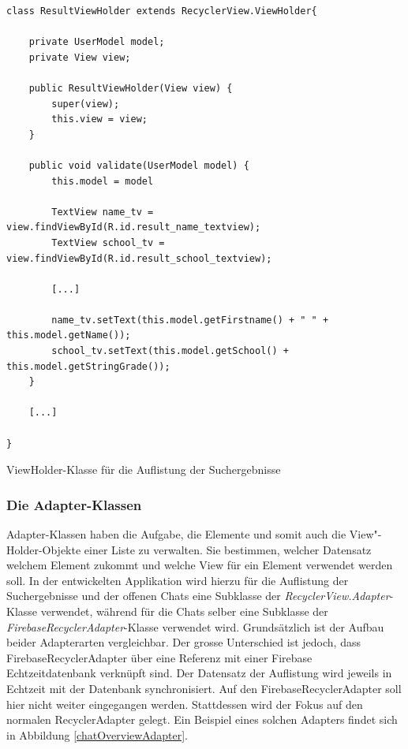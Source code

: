 \documentclass[../main.tex]{subfiles}
\begin{document}
\begin{code}
	\begin{center}
		\begin{verbatim}
class ResultViewHolder extends RecyclerView.ViewHolder{
	
	private UserModel model;
	private View view;
	
	public ResultViewHolder(View view) {
		super(view);
		this.view = view;
	}
	
	public void validate(UserModel model) {
		this.model = model
	
		TextView name_tv = view.findViewById(R.id.result_name_textview);
		TextView school_tv = view.findViewById(R.id.result_school_textview);
		
		[...]
		
		name_tv.setText(this.model.getFirstname() + " " + this.model.getName());
		school_tv.setText(this.model.getSchool() + this.model.getStringGrade());
	}
	
	[...]
	
}
		\end{verbatim}
		\caption{ViewHolder-Klasse für die Auflistung der Suchergebnisse}
		\label{viewHolder}
	\end{center}
\end{code}

	
	\subsubsection{Die Adapter-Klassen}
	Adapter-Klassen haben die Aufgabe, die Elemente und somit auch die View"-Holder-Objekte einer Liste zu verwalten. Sie bestimmen, welcher Datensatz welchem Element zukommt und welche View für ein Element verwendet werden soll. In der entwickelten Applikation wird hierzu für die Auflistung der Suchergebnisse und der offenen Chats eine Subklasse der \emph{RecyclerView.Adapter}-Klasse verwendet, während für die Chats selber eine Subklasse der \emph{FirebaseRecyclerAdapter}-Klasse verwendet wird. Grundsätzlich ist der Aufbau beider Adapterarten vergleichbar. Der grosse Unterschied ist jedoch, dass FirebaseRecyclerAdapter über eine Referenz mit einer Firebase Echtzeitdatenbank verknüpft sind. Der Datensatz der Auflistung wird jeweils in Echtzeit mit der Datenbank synchronisiert. Auf den FirebaseRecyclerAdapter soll hier nicht weiter eingegangen werden. Stattdessen wird der Fokus auf den normalen RecyclerAdapter gelegt. Ein Beispiel eines solchen Adapters findet sich in Abbildung \ref{chatOverviewAdapter}.
	
\end{document}
